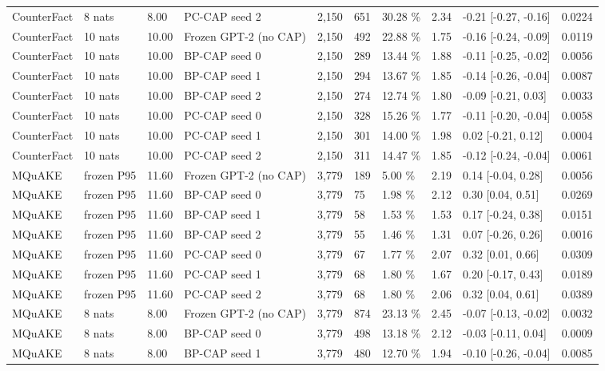 \documentclass[10pt,a4paper]{article}
\begin{document}
\begin{center}
\begin{tabularx}{\textwidth}{@{}p{}XXXXXXXXX@{}}
CounterFact & 8 nats & 8.00 & PC-CAP seed 2 & 2,150 & 651 & 30.28 \% & 2.34 & -0.21 [-0.27, -0.16] & 0.0224 \\
CounterFact & 10 nats & 10.00 & Frozen GPT-2 (no CAP) & 2,150 & 492 & 22.88 \% & 1.75 & -0.16 [-0.24, -0.09] & 0.0119 \\
CounterFact & 10 nats & 10.00 & BP-CAP seed 0 & 2,150 & 289 & 13.44 \% & 1.88 & -0.11 [-0.25, -0.02] & 0.0056 \\
CounterFact & 10 nats & 10.00 & BP-CAP seed 1 & 2,150 & 294 & 13.67 \% & 1.85 & -0.14 [-0.26, -0.04] & 0.0087 \\
CounterFact & 10 nats & 10.00 & BP-CAP seed 2 & 2,150 & 274 & 12.74 \% & 1.80 & -0.09 [-0.21, 0.03] & 0.0033 \\
CounterFact & 10 nats & 10.00 & PC-CAP seed 0 & 2,150 & 328 & 15.26 \% & 1.77 & -0.11 [-0.20, -0.04] & 0.0058 \\
CounterFact & 10 nats & 10.00 & PC-CAP seed 1 & 2,150 & 301 & 14.00 \% & 1.98 & 0.02 [-0.21, 0.12] & 0.0004 \\
CounterFact & 10 nats & 10.00 & PC-CAP seed 2 & 2,150 & 311 & 14.47 \% & 1.85 & -0.12 [-0.24, -0.04] & 0.0061 \\
MQuAKE & frozen P95 & 11.60 & Frozen GPT-2 (no CAP) & 3,779 & 189 & 5.00 \% & 2.19 & 0.14 [-0.04, 0.28] & 0.0056 \\
MQuAKE & frozen P95 & 11.60 & BP-CAP seed 0 & 3,779 & 75 & 1.98 \% & 2.12 & 0.30 [0.04, 0.51] & 0.0269 \\
MQuAKE & frozen P95 & 11.60 & BP-CAP seed 1 & 3,779 & 58 & 1.53 \% & 1.53 & 0.17 [-0.24, 0.38] & 0.0151 \\
MQuAKE & frozen P95 & 11.60 & BP-CAP seed 2 & 3,779 & 55 & 1.46 \% & 1.31 & 0.07 [-0.26, 0.26] & 0.0016 \\
MQuAKE & frozen P95 & 11.60 & PC-CAP seed 0 & 3,779 & 67 & 1.77 \% & 2.07 & 0.32 [0.01, 0.66] & 0.0309 \\
MQuAKE & frozen P95 & 11.60 & PC-CAP seed 1 & 3,779 & 68 & 1.80 \% & 1.67 & 0.20 [-0.17, 0.43] & 0.0189 \\
MQuAKE & frozen P95 & 11.60 & PC-CAP seed 2 & 3,779 & 68 & 1.80 \% & 2.06 & 0.32 [0.04, 0.61] & 0.0389 \\
MQuAKE & 8 nats & 8.00 & Frozen GPT-2 (no CAP) & 3,779 & 874 & 23.13 \% & 2.45 & -0.07 [-0.13, -0.02] & 0.0032 \\
MQuAKE & 8 nats & 8.00 & BP-CAP seed 0 & 3,779 & 498 & 13.18 \% & 2.12 & -0.03 [-0.11, 0.04] & 0.0009 \\
MQuAKE & 8 nats & 8.00 & BP-CAP seed 1 & 3,779 & 480 & 12.70 \% & 1.94 & -0.10 [-0.26, -0.04] & 0.0085 \\

\end{tabularx}
\end{center}
\end{document}
